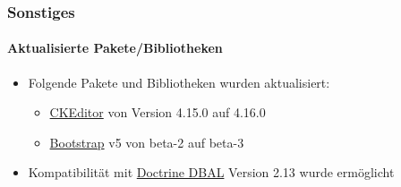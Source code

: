 %

\begin{frame}[fragile]
	\frametitle{Sonstiges}
	\framesubtitle{Aktualisierte Pakete/Bibliotheken}

	\begin{itemize}
		\item Folgende Pakete und Bibliotheken wurden aktualisiert:
		\begin{itemize}
			\item \href{https://ckeditor.com/}{CKEditor} von Version 4.15.0 auf 4.16.0
			\item \href{https://getbootstrap.com/}{Bootstrap} v5 von beta-2 auf beta-3
		\end{itemize}
		\item Kompatibilität mit
			\href{https://www.doctrine-project.org/projects/dbal.html}{Doctrine DBAL}
			Version 2.13 wurde ermöglicht
	\end{itemize}

\end{frame}

